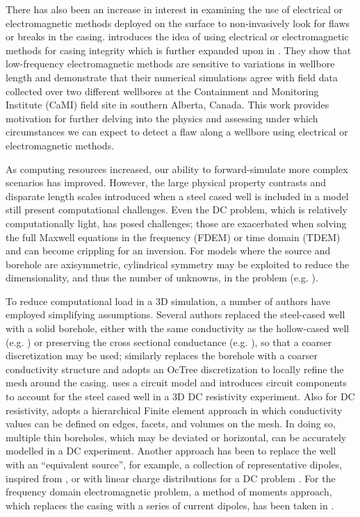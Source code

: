 There has also been an increase in interest in examining the use of electrical or electromagnetic methods deployed on the surface to non-invasively look for flaws or breaks in the casing. \cite{Wilt2018} introduces the idea of using electrical or electromagnetic methods for casing integrity which is further expanded upon in \cite{Wilt2018a}. They show that low-frequency electromagnetic methods are sensitive to variations in wellbore length and demonstrate that their numerical simulations agree with field data collected over two different wellbores at the Containment and Monitoring Institute (CaMI) field site in southern Alberta, Canada. This work provides motivation for further delving into the physics and assessing under which circumstances we can expect to detect a flaw along a wellbore using electrical or electromagnetic methods.

As computing resources increased, our ability to forward-simulate more complex scenarios has improved. However, the large physical property contrasts and disparate length scales introduced when a steel cased well is included in a model still present computational challenges. Even the DC problem, which is relatively computationally light, has posed challenges; those are exacerbated when solving the full Maxwell equations in the frequency (FDEM) or time domain (TDEM) and can become crippling for an inversion. For models where the source and borehole are axisymmetric, cylindrical symmetry may be exploited to reduce the dimensionality, and thus the number of unknowns, in the problem (e.g. \cite{Pardo2013, Heagy2015}).

To reduce computational load in a 3D simulation, a number of authors have employed simplifying assumptions. Several authors replaced the steel-cased well with a solid borehole, either with the same conductivity as the hollow-cased well (e.g. \cite{Um2015, Puzyrev2017}) or preserving the cross sectional conductance (e.g. \cite{Swidinsky2013, Kohnke2017}), so that a coarser discretization may be used; \cite{Haber2016} similarly replaces the borehole with a coarser conductivity structure and adopts an OcTree discretization to locally refine the mesh around the casing. \cite{Yang2016} uses a circuit model and introduces circuit components to account for the steel cased well in a 3D DC resistivity experiment. Also for DC resistivity, \cite{Weiss2017} adopts a hierarchical Finite element approach in which conductivity values can be defined on edges, facets, and volumes on the mesh. In doing so, multiple thin boreholes, which may be deviated or horizontal, can be accurately modelled in a DC experiment. Another approach has been to replace the well with an ``equivalent source'', for example, a collection of representative dipoles, inspired from \cite{cuevas2014}, or with linear charge distributions for a DC problem \citep{Weiss2016}. For the frequency domain electromagnetic problem, a method of moments approach, which replaces the casing with a series of current dipoles, has been taken in \cite{Kohnke2017}.

